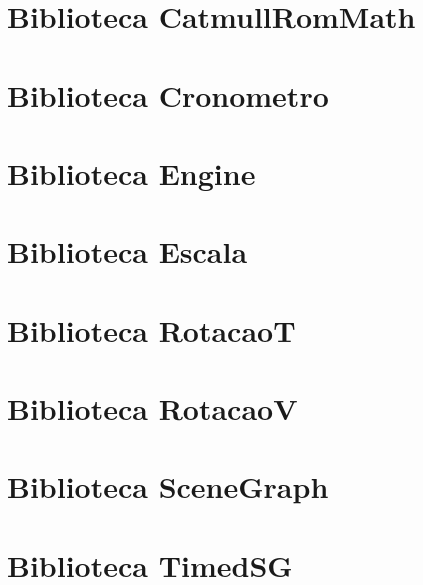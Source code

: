 \documentclass{article}
\begin{document}
\newpage


\appendix

\section{Biblioteca CatmullRomMath}


\newpage

\section{Biblioteca Cronometro}


\newpage

\section{Biblioteca Engine}


\newpage

\section{Biblioteca Escala}


\newpage

\section{Biblioteca RotacaoT}


\newpage

\section{Biblioteca RotacaoV}


\newpage

\section{Biblioteca SceneGraph}


\newpage

\section{Biblioteca TimedSG}


\newpage
\end{document}
